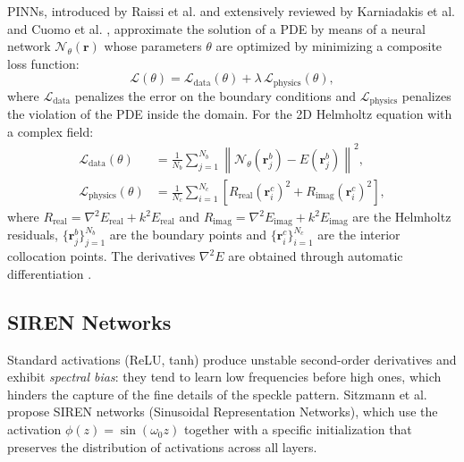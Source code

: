 PINNs, introduced by Raissi et al. \cite{Raissi2019_PINNs} and extensively reviewed
by Karniadakis et al. \cite{Karniadakis2021_review} and Cuomo et al.
\cite{Cuomo2022_review}, approximate the solution of a PDE by means of a neural
network $\mathcal{N}_\theta(\mathbf{r})$ whose parameters $\theta$ are optimized by
minimizing a composite loss function:
%
\begin{equation}
  \mathcal{L}(\theta) = \mathcal{L}_{\mathrm{data}}(\theta)
                      + \lambda\,\mathcal{L}_{\mathrm{physics}}(\theta),
  \label{eq:loss_total}
\end{equation}
%
where $\mathcal{L}_{\mathrm{data}}$ penalizes the error on the boundary conditions
and $\mathcal{L}_{\mathrm{physics}}$ penalizes the violation of the PDE inside the
domain.
For the 2D Helmholtz equation with a complex field:
%
\begin{align}
  \mathcal{L}_{\mathrm{data}}(\theta) &=
    \frac{1}{N_b}\sum_{j=1}^{N_b}
    \left\|\mathcal{N}_\theta(\mathbf{r}_j^b) - E(\mathbf{r}_j^b)\right\|^2,
  \label{eq:loss_data} \\
  \mathcal{L}_{\mathrm{physics}}(\theta) &=
    \frac{1}{N_c}\sum_{i=1}^{N_c}
    \left[R_{\mathrm{real}}(\mathbf{r}_i^c)^2 + R_{\mathrm{imag}}(\mathbf{r}_i^c)^2\right],
  \label{eq:loss_physics}
\end{align}
%
where $R_{\mathrm{real}} = \nabla^2 E_{\mathrm{real}} + k^2 E_{\mathrm{real}}$ and
$R_{\mathrm{imag}} = \nabla^2 E_{\mathrm{imag}} + k^2 E_{\mathrm{imag}}$ are the
Helmholtz residuals, $\{\mathbf{r}_j^b\}_{j=1}^{N_b}$ are the boundary points and
$\{\mathbf{r}_i^c\}_{i=1}^{N_c}$ are the interior collocation points.
The derivatives $\nabla^2 E$ are obtained through automatic differentiation
\cite{Baydin2018_autodiff}.

\subsection{SIREN Networks}
\label{subsec:siren}

Standard activations (ReLU, tanh) produce unstable second-order derivatives and
exhibit \textit{spectral bias}: they tend to learn low frequencies before high ones,
which hinders the capture of the fine details of the speckle pattern.
Sitzmann et al. \cite{Sitzmann2020_SIREN} propose SIREN networks (Sinusoidal
Representation Networks), which use the activation $\phi(z) = \sin(\omega_0 z)$
together with a specific initialization that preserves the distribution of
activations across all layers.

